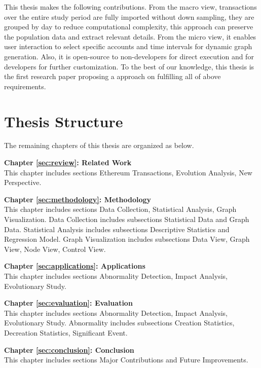 This thesis makes the following contributions. From the macro view, transactions over the entire study period are fully imported without down sampling, they are grouped by day to reduce computational complexity, this approach can preserve the population data and extract relevant details. From the micro view, it enables user interaction to select specific accounts and time intervals for dynamic graph generation. Also, it is open-source to non-developers for direct execution and for developers for further customization. To the best of our knowledge, this thesis is the first research paper proposing a approach on fulfilling all of above requirements.

\section{Thesis Structure}
\label{sec:intro:structure}

The remaining chapters of this thesis are organized as below.

\textbf{Chapter \ref{sec:review}: Related Work} \\[0.2em]
This chapter includes sections Ethereum Transactions, Evolution Analysis, New Perspective.

\textbf{Chapter \ref{sec:methodology}: Methodology} \\[0.2em]
This chapter includes sections Data Collection, Statistical Analysis, Graph Visualization. Data Collection includes subsections Statistical Data and Graph Data. Statistical Analysis includes subsections Descriptive Statistics and Regression Model. Graph Visualization includes subsections Data View, Graph View, Node View, Control View.

\textbf{Chapter \ref{sec:applications}: Applications} \\[0.2em]
This chapter includes sections Abnormality Detection, Impact Analysis, Evolutionary Study.

\textbf{Chapter \ref{sec:evaluation}: Evaluation} \\[0.2em]
This chapter includes sections Abnormality Detection, Impact Analysis, Evolutionary Study. Abnormality includes subsections Creation Statistics, Decreation Statistics, Significant Event. 

\textbf{Chapter \ref{sec:conclusion}: Conclusion} \\[0.2em]
This chapter includes sections Major Contributions and Future Improvements.
